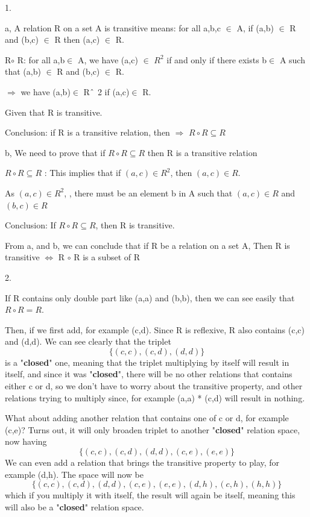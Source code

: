\documentclass[12pt]{amsart}
\begin{document}
1.

a, A relation R on a set A is transitive means: for all a,b,c $ \in $ A, if (a,b) $ \in $  R and (b,c) $ \in $  R then (a,c) $ \in $  R. \par\par
 R$ \circ$ R: for all a,b$ \in $ A, we have (a,c) $ \in $  $R^  2$ if and only if there exists b$ \in $ A such that (a,b) $ \in $  R and (b,c) $ \in $  R.\par\par
 $\Rightarrow$  we have (a,b)$ \in $ R$ \string^ $ 2 if (a,c)$ \in $ R. \par\par
 Given that R is transitive. 
 
 Conclusion: if R is a transitive relation, then $\Rightarrow$ $R\circ R 	\subseteq R$

b, We need to prove that if $R\circ R 	\subseteq R$ then R is a transitive relation

$R\circ R 	\subseteq R$ : This implies that if $(a,c)\in R^2$, then  $(a,c)\in R$.

As  $(a,c)\in R^2$, , there must be an element b in A such that  $(a,c)\in R$ and $(b,c)\in R$

Conclusion: If $R\circ R 	\subseteq R$, then R is transitive.

From a, and b, we can conclude that if R be a relation on a set A, Then R is transitive $\Leftrightarrow$ R $\circ$ R is a subset of R

2.

If R contains only double part like (a,a) and (b,b), then we can see easily that $R\circ R 	= R$.

Then, if we first add, for example (c,d). Since R is reflexive, R also contains (c,c) and (d,d). We can see clearly that the triplet\[\{(c,c), (c,d) , (d,d)\}\] is a "\textbf{closed}" one, meaning that the triplet multiplying by itself will result in itself, and since it was "\textbf{closed}", there will be no other relations that contains either c or d, so we don't have to worry about the transitive property, and other relations trying to multiply since, for example (a,a) * (c,d) will result in nothing. 

What about adding another relation that contains one of c or d, for example (c,e)? Turns out, it will only broaden triplet to another "\textbf{closed}" relation space, now having \[\{(c,c),(c,d),(d,d),(c,e),(e,e)\}\]We can even add a relation that brings the transitive property to play, for example (d,h). The space will now be \[\{(c,c),(c,d),(d,d),(c,e),(e,e),(d,h),(c,h),(h,h)\}\]which if you multiply it with itself, the result will again be itself, meaning this will also be a "\textbf{closed}" relation space. 
\end{document}
